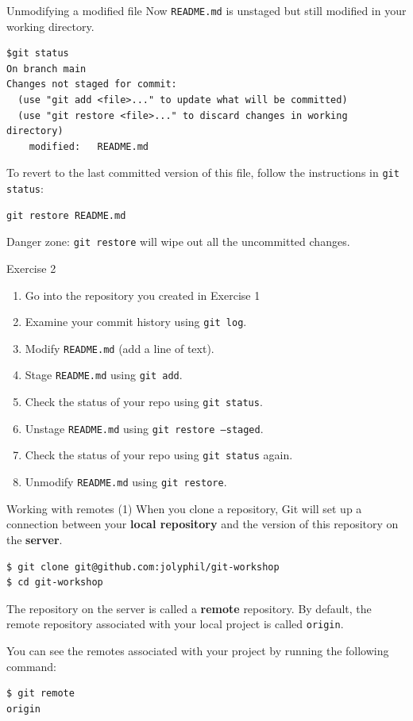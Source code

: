 \documentclass[handout]{beamer}
\begin{document}
\begin{frame}[fragile]{Unmodifying a modified file}
Now \texttt{README.md} is unstaged but still modified in your working directory. 
\begin{lstlisting}
$git status
On branch main
Changes not staged for commit:
  (use "git add <file>..." to update what will be committed)
  (use "git restore <file>..." to discard changes in working directory)
	modified:   README.md
\end{lstlisting}
To revert to the last committed version of this file, follow the instructions in \texttt{git status}:
\begin{lstlisting}
git restore README.md
\end{lstlisting}
\alert{Danger zone}: \texttt{git restore} will wipe out all the uncommitted changes.
\end{frame}

\begin{frame}{Exercise 2}
	\begin{enumerate}
		\item Go into the repository you created in Exercise 1
		\item Examine your commit history using \texttt{git log}.
		\item Modify \texttt{README.md} (add a line of text).
		\item Stage \texttt{README.md} using \texttt{git add}. 
		\item Check the status of your repo using \texttt{git status}. 
		\item Unstage \texttt{README.md} using \texttt{git restore --staged}.
		\item Check the status of your repo using \texttt{git status} again. 
		\item Unmodify \texttt{README.md} using \texttt{git restore}.
	\end{enumerate}
\end{frame}

\begin{frame}[fragile]{Working with remotes (1)}
	When you clone a repository, Git will set up a connection between your \textbf{local repository} and the version of this repository on the \textbf{server}. 
\begin{lstlisting}
$ git clone git@github.com:jolyphil/git-workshop
$ cd git-workshop
\end{lstlisting}
	The repository on the server is called a \textbf{remote} repository. By default, the remote repository associated with your local project is called \texttt{origin}.
	
\vspace{0.5cm}	
	
	You can see the remotes associated with your project by running the following command:
	
\begin{lstlisting}
$ git remote
origin
\end{lstlisting}
	
\end{frame}
\end{document}
